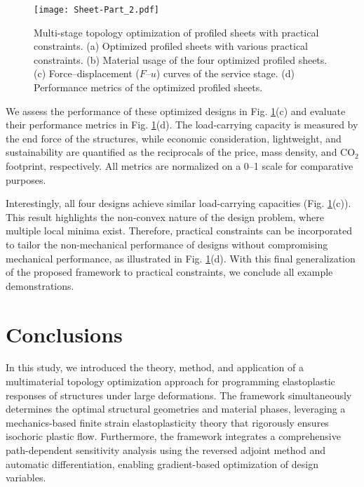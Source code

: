 \documentclass[preprint,11pt]{elsarticle}
\theoremstyle{definition}
\begin{document}
\begin{figure}[!htbp]
    \centering
    \texttt{[image: Sheet-Part\_2.pdf]}
    \caption{Multi-stage topology optimization of profiled sheets with practical constraints. (a) Optimized profiled sheets with various practical constraints. (b) Material usage of the four optimized profiled sheets. (c) Force--displacement ($F$--$u$) curves of the service stage. (d) Performance metrics of the optimized profiled sheets.}
    \label{Fig: Sheet-Part 2}
\end{figure}
 
We assess the performance of these optimized designs in Fig. \ref{Fig: Sheet-Part 2}(c) and evaluate their performance metrics in Fig. \ref{Fig: Sheet-Part 2}(d). The load-carrying capacity is measured by the end force of the structures, while economic consideration, lightweight, and sustainability are quantified as the reciprocals of the price, mass density, and CO$_2$ footprint, respectively. All metrics are normalized on a 0--1 scale for comparative purposes.

Interestingly, all four designs achieve similar load-carrying capacities (Fig. \ref{Fig: Sheet-Part 2}(c)). This result highlights the non-convex nature of the design problem, where multiple local minima exist. Therefore, practical constraints can be incorporated to tailor the non-mechanical performance of designs without compromising mechanical performance, as illustrated in Fig. \ref{Fig: Sheet-Part 2}(d). With this final generalization of the proposed framework to practical constraints, we conclude all example demonstrations.


\section{Conclusions}
\label{Sec: Conclusions}

In this study, we introduced the theory, method, and application of a multimaterial topology optimization approach for programming elastoplastic responses of structures under large deformations. The framework simultaneously determines the optimal structural geometries and material phases, leveraging a mechanics-based finite strain elastoplasticity theory that rigorously ensures isochoric plastic flow. Furthermore, the framework integrates a comprehensive path-dependent sensitivity analysis using the reversed adjoint method and automatic differentiation, enabling gradient-based optimization of design variables.
\end{document}

